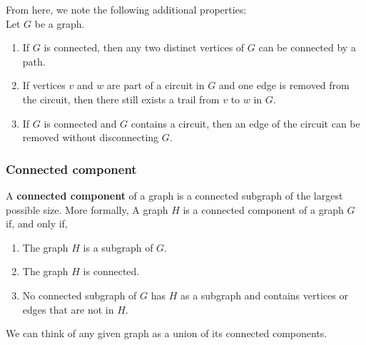 \documentclass[a4paper]{article}
\begin{document}
From here, we note the following additional properties:\\
Let $G$ be a graph.
\begin{enumerate}
	\item If $G$ is connected, then any two distinct vertices of $G$ can be connected by a path.
	\item If vertices $v$ and $w$ are part of a circuit in $G$ and one edge is removed from the circuit, then there still exists a trail from $v$ to $w$ in $G$.
	\item If $G$ is connected and $G$ contains a circuit, then an edge of the circuit can be removed without disconnecting $G$.
\end{enumerate}
\subsubsection{Connected component}
A \textbf{connected component} of a graph is a connected subgraph of the largest possible size. More formally, A graph $H$ is a connected component of a graph $G$ if, and only if,
\begin{enumerate}
	\item The graph $H$ is a subgraph of $G$.
	\item The graph $H$ is connected.
	\item No connected subgraph of $G$ has $H$ as a subgraph and contains vertices or edges that are not in $H$. 
\end{enumerate}
We can think of any given graph as a union of its connected components.
\end{document}
